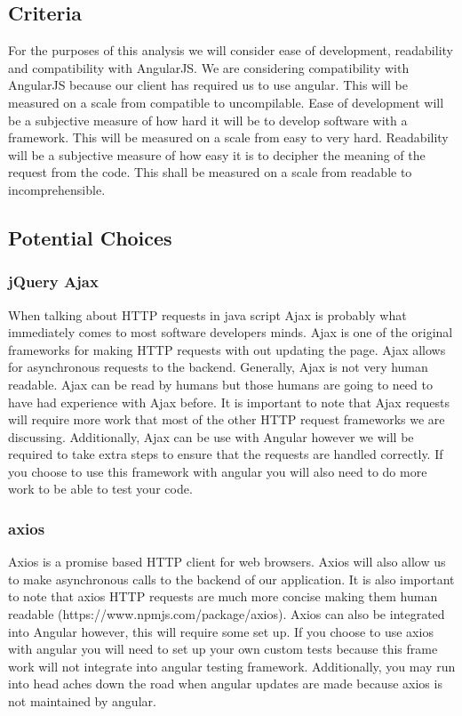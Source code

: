 \documentclass[letterpaper,10pt]{article}
\begin{document}
	\subsection{Criteria}
		For the purposes of this analysis we will consider ease of development, readability and compatibility with AngularJS. We are considering compatibility with AngularJS because our client has required us to use angular. This will be measured on a scale from compatible to uncompilable. Ease of development will be a subjective measure of how hard it will be to develop software with a framework. This will be measured on a scale from easy to very hard. Readability will be a subjective measure of how easy it is to decipher the meaning of the request from the code. This shall be measured on a scale from readable to incomprehensible.\\
	\subsection{Potential Choices}
		\subsubsection{jQuery Ajax}
			When talking about HTTP requests in java script Ajax is probably what immediately comes to most software developers minds. Ajax is one of the original frameworks for making HTTP requests with out updating the page. Ajax allows for asynchronous requests to the backend. Generally, Ajax is not very human readable. Ajax can be read by humans but those humans are going to need to have had experience with Ajax before. It is important to note that Ajax requests will require more work that most of the other HTTP request frameworks we are discussing. Additionally, Ajax can be use with Angular however we will be required to take extra steps to ensure that the requests are handled correctly. If you choose to use this framework with angular you will also need to do more work to be able to test your code.
		\subsubsection{axios}
			Axios is a promise based HTTP client for web browsers. Axios will also allow us to make asynchronous calls to the backend of our application. It is also important to note that axios HTTP requests are much more concise making them human readable (https://www.npmjs.com/package/axios). Axios can also be integrated into Angular however, this will require some set up. If you choose to use axios with angular you will need to set up your own custom tests because this frame work will not integrate into angular testing framework. Additionally, you may run into head aches down the road when angular updates are made because axios is not maintained by angular.
\end{document}
